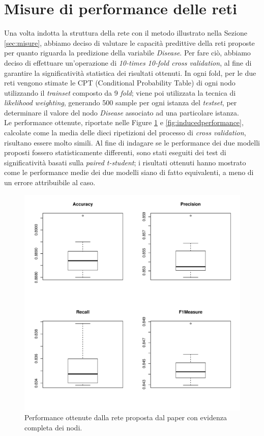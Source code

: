 \section{Misure di performance delle reti}
\label{sec:performance}
Una volta indotta la struttura della rete con il metodo illustrato nella Sezione \ref{sec:misure}, abbiamo deciso di valutare le capacità predittive della reti proposte per quanto riguarda la predizione della variabile \textit{Disease}. Per fare ciò, abbiamo deciso di effettuare un'operazione di \textit{10-times 10-fold cross validation}, al fine di garantire la significatività statistica dei risultati ottenuti. In ogni fold, per le due reti vengono stimate le CPT (Conditional Probability Table) di ogni nodo utilizzando il \textit{trainset} composto da 9 \textit{fold}; viene poi utilizzata la tecnica di \textit{likelihood weighting}, generando 500 sample per ogni istanza del \textit{testset}, per determinare il valore del nodo \textit{Disease} associato ad una particolare istanza.\\
Le performance ottenute, riportate nelle Figure \ref{fig:paperperformance} e \ref{fig:inducedperformance}, calcolate come la media delle dieci ripetizioni del processo di \textit{cross validation}, risultano essere molto simili. Al fine di indagare se le performance dei due modelli proposti fossero statisticamente differenti, sono stati eseguiti dei test di significatività basati sulla \textit{paired t-student}; i risultati ottenuti hanno mostrato come le performance medie dei due modelli siano di fatto equivalenti, a meno di un errore attribuibile al caso.
\begin{figure}
	\centering
	\includegraphics[width=0.7\linewidth]{images/paper_performance}
	\caption{Performance ottenute dalla rete proposta dal paper con evidenza completa dei nodi.}
	\label{fig:paperperformance}
\end{figure}
